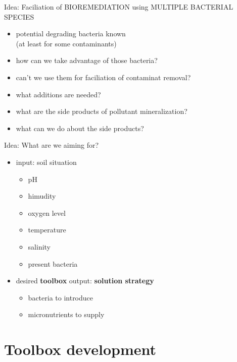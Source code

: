 \documentclass[style=aggie]{powerdot}
\begin{document}
\begin{slide}{Idea: Faciliation of BIOREMEDIATION using MULTIPLE BACTERIAL SPECIES}
\begin{itemize}
 \item potential degrading bacteria known\\ (at least for some contaminants)\newline
 \item how can we take advantage of those bacteria?\newline
 \item can't we use them for faciliation of contaminat removal?\newline
 \item what additions are needed?\newline
 \item what are the side products of pollutant mineralization?\newline
 \item what can we do about the side products?
\end{itemize}
\end{slide}

\begin{slide}{Idea: What are we aiming for?}
\begin{itemize}
 \item input: soil situation
 \begin{itemize}
  \item pH
  \item himudity
  \item oxygen level
  \item temperature
  \item salinity
  \item present bacteria
   \newline
 \end{itemize}

 \item desired \textbf{toolbox} output: \textbf{solution strategy}
 \begin{itemize}
  \item bacteria to introduce
  \item micronutrients to supply
 \end{itemize}

\end{itemize}
\end{slide}

\section{Toolbox development}
\end{document}
